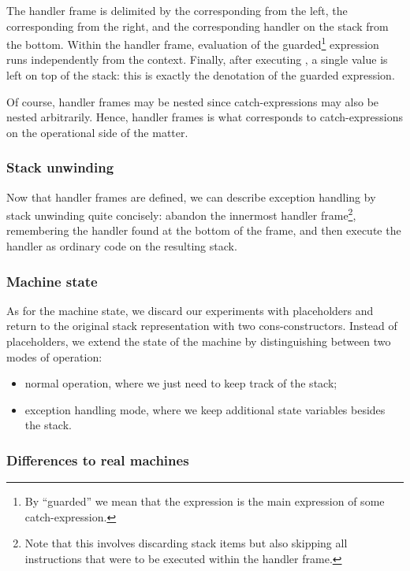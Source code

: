 The handler frame is delimited by the corresponding  from the left,
the corresponding  from the right, and the corresponding handler
on the stack from the bottom. Within the handler frame, evaluation of the
guarded\footnote{%
By ``guarded'' we mean that the expression is the main expression of
some catch-expression.
} expression runs independently from the context. Finally, after executing
, a single value is left on top of the stack: this is exactly
the denotation of the guarded expression.

Of course, handler frames may be nested since catch-expressions may also
be nested arbitrarily.
Hence, handler frames is what corresponds to catch-expressions on the operational
side of the matter.


\subsubsection{Stack unwinding}
Now that handler frames are defined, we can describe exception handling
by stack unwinding quite concisely: abandon the innermost handler frame\footnote{%
Note that this involves discarding stack items but also skipping all instructions
that were to be executed within the handler frame.},
remembering the handler found at the bottom of the frame, and then
execute the handler as ordinary code on the resulting stack.

\subsubsection{Machine state}

As for the machine state, we discard our experiments with placeholders and return
to the original stack representation with two cons-constructors.
Instead of placeholders, we extend the state of the machine by distinguishing between
two modes of operation:
\begin{itemize}
	\item normal operation, where we just need to keep track of the stack;
	\item exception handling mode, where we keep additional state variables besides the stack.
\end{itemize}

\subsubsection{Differences to real machines}

